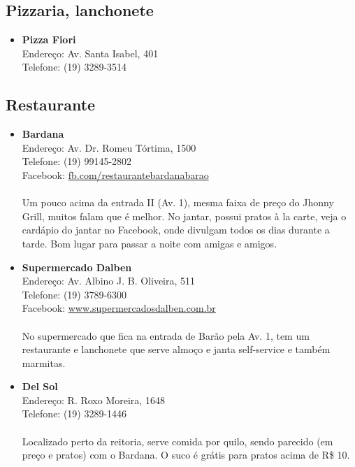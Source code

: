 \subsection{Pizzaria, lanchonete}

\begin{itemize}
\item \textbf{Pizza Fiori}
  \\Endereço: Av. Santa Isabel, 401
  \\Telefone: (19) 3289-3514
\end{itemize}

\subsection{Restaurante}

\begin{itemize}
\item \textbf{Bardana}
  \\Endereço: Av. Dr. Romeu Tórtima, 1500
  \\Telefone: (19) 99145-2802
  \\Facebook: \url{fb.com/restaurantebardanabarao}
  \\
  \\Um pouco acima da entrada II (Av. 1), mesma faixa de preço do Jhonny Grill,
  muitos falam que é melhor. No jantar, possui pratos à la carte, veja o
  cardápio do jantar no Facebook, onde divulgam todos os dias durante a tarde.
  Bom lugar para passar a noite com amigas e amigos.

\item \textbf{Supermercado Dalben}
  \\Endereço: Av. Albino J. B. Oliveira, 511
  \\Telefone: (19) 3789-6300
  \\Facebook: \url{www.supermercadosdalben.com.br}
  \\
  \\No supermercado que fica na entrada de Barão pela Av. 1, tem um restaurante
  e lanchonete que serve almoço e janta self-service e também marmitas.

\item \textbf{Del Sol}
  \\Endereço: R. Roxo Moreira, 1648
  \\Telefone: (19) 3289-1446
  \\
  \\Localizado perto da reitoria, serve comida por quilo, sendo parecido (em
  preço e pratos) com o Bardana. O suco é grátis para pratos acima de R\$ 10.


\end{itemize}
